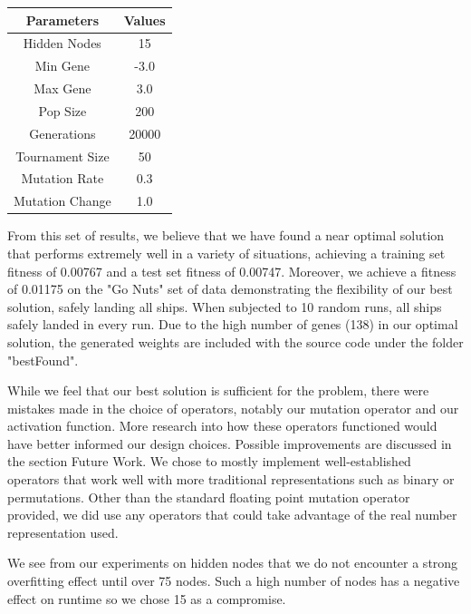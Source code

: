 \documentclass[sigconf]{acmart}
\begin{document}
\vspace{1em}
\begin{center}

\begin{tabular} {|c|c|}
\hline
Parameters & Values \\
\hline
Hidden Nodes & 15 \\
Min Gene & -3.0 \\
Max Gene & 3.0 \\
Pop Size & 200 \\
Generations & 20000 \\
Tournament Size & 50 \\
Mutation Rate & 0.3 \\
Mutation Change & 1.0 \\
\hline

\end{tabular}

\end{center}
\vspace{1em}


From this set of results, we believe that we have found a near optimal solution that performs extremely well in a variety of situations, achieving a training set fitness of 0.00767 and a test set fitness of 0.00747. Moreover, we achieve a fitness of 0.01175 on the "Go Nuts" set of data demonstrating the flexibility of our best solution, safely landing all ships. When subjected to 10 random runs, all ships safely landed in every run. Due to the high number of genes (138)  in our optimal solution, the generated weights are included with the source code under the folder "bestFound".


While we feel that our best solution is sufficient for the problem, there were mistakes made in the choice of operators, notably our mutation operator and our activation function. More research into how these operators functioned would have better informed our design choices. Possible improvements are discussed in the section Future Work.
We chose to mostly implement well-established operators that work well with more traditional representations such as binary or permutations. Other than the standard floating point mutation operator provided, we did use any operators that could take advantage of the real number representation used.

We see from our experiments on hidden nodes that we do not encounter a strong overfitting effect until over 75 nodes. Such a high number of nodes has a negative effect on runtime so we chose 15 as a compromise.
\end{document}
